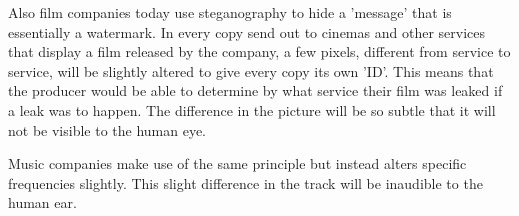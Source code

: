 Also film companies today use steganography to hide a 'message' that is essentially a watermark. In every copy send out to cinemas and other services that display a film released by the company, a few pixels, different from service to service, will be slightly altered to give every copy its own 'ID'.
This means that the producer would be able to determine by what service their film was leaked if a leak was to happen.
The difference in the picture will be so subtle that it will not be visible to the human eye.

Music companies make use of the same principle but instead alters specific frequencies slightly. This slight difference in the track will be inaudible to the human ear.

